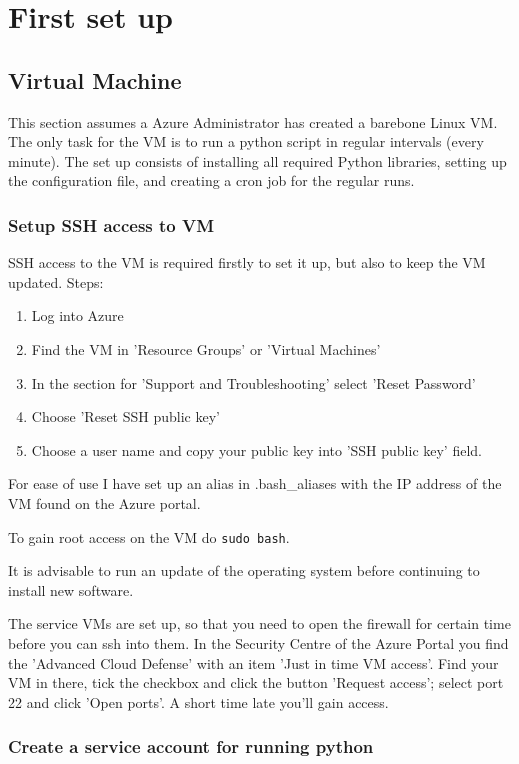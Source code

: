 \section{First set up}
\subsection{Virtual Machine}
This section assumes a Azure Administrator has created a barebone Linux VM. The only task for the VM is to run a python script in regular
intervals (every minute). The set up consists of installing all required Python libraries, setting up the configuration file, and creating a 
cron job for the regular runs.

\subsubsection{Setup SSH access to VM}
SSH access to the VM is required firstly to set it up, but also to keep the VM updated. Steps:
\begin{enumerate}
  \item Log into Azure
  \item Find the VM in 'Resource Groups' or 'Virtual Machines'
  \item In the section for 'Support and Troubleshooting' select 'Reset Password'
  \item Choose 'Reset SSH public key'
  \item Choose a user name and copy your public key into 'SSH public key' field.
\end{enumerate}
For ease of use I have set up an alias in .bash\_aliases with the IP address of the VM found on the Azure portal.

To gain root access on the VM do \verb|sudo bash|.

It is advisable to run an update of the operating system before continuing to install new software.

The service VMs are set up, so that you need to open the firewall for certain time before you can ssh into them.
In the Security Centre of the Azure Portal you find the 'Advanced Cloud Defense' with an item 'Just in time VM access'. 
Find your VM in there, tick the checkbox and click the button 'Request access'; select port 22 and click 'Open ports'.
A short time late you'll gain access.

\subsubsection{Create a service account for running python}
\label{sec:useraccout}

